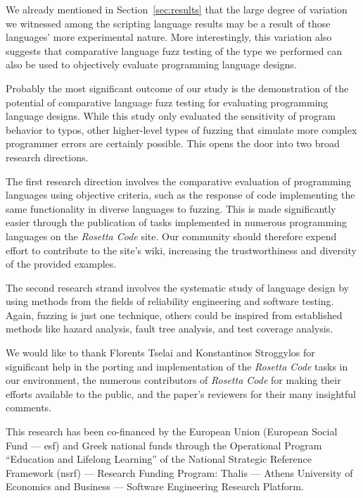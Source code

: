 \documentclass[10pt]{sigplanconf}
\begin{document}
We already mentioned in Section~\ref{sec:results} that the
large degree of variation we witnessed among the scripting
language results may be a result of those languages'
more experimental nature.
More interestingly, this variation also suggests that
comparative language fuzz testing of the type we performed
can also be used to objectively evaluate programming language
designs.

Probably the most significant outcome of our study is the
demonstration of the potential of comparative language fuzz testing
for evaluating programming language designs.
While this study only evaluated the sensitivity of program behavior to typos,
other higher-level types of fuzzing
that simulate more complex programmer errors are certainly possible.
This opens the door into two broad research directions.

The first research direction involves the comparative evaluation
of programming languages using objective criteria,
such as the response of code implementing the same functionality
in diverse languages to fuzzing.
This is made significantly easier through the publication of
tasks implemented in numerous programming languages on the
{\em Rosetta Code} site.
Our community should therefore expend effort to contribute to
the site's wiki, increasing the trustworthiness and diversity of
the provided examples.

The second research strand involves the systematic study of
language design by using methods from the fields of reliability engineering
and software testing.
Again, fuzzing is just one technique, others could be inspired from
established methods like
hazard analysis,
fault tree analysis, and
test coverage analysis.

\acks

We would like to thank Florents Tselai and Konstantinos Stroggylos
for significant help in the porting and implementation of the
{\em Rosetta Code} tasks in our environment,
the numerous contributors of {\em Rosetta Code} for
making their efforts available to the public,
and the paper's reviewers for their many insightful comments.

This research has been co-financed by
the European Union (European Social Fund --- {\sc esf})
and Greek national funds through the Operational Program
``Education and Lifelong Learning''
of the National Strategic Reference Framework ({\sc nsrf})
--- Research Funding Program:
Thalis ---
Athens University of Economics and Business ---
Software Engineering Research Platform.
\end{document}
